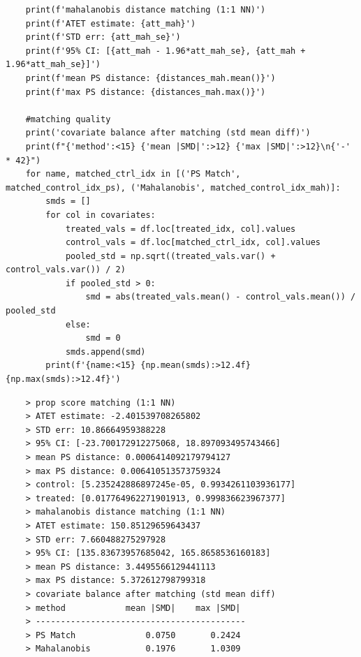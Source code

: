 \documentclass[10pt]{article}
\begin{document}
\begin{lstlisting}
    print(f'mahalanobis distance matching (1:1 NN)')
    print(f'ATET estimate: {att_mah}')
    print(f'STD err: {att_mah_se}')
    print(f'95% CI: [{att_mah - 1.96*att_mah_se}, {att_mah + 1.96*att_mah_se}]')
    print(f'mean PS distance: {distances_mah.mean()}')
    print(f'max PS distance: {distances_mah.max()}')

    #matching quality
    print('covariate balance after matching (std mean diff)')
    print(f"{'method':<15} {'mean |SMD|':>12} {'max |SMD|':>12}\n{'-' * 42}")
    for name, matched_ctrl_idx in [('PS Match', matched_control_idx_ps), ('Mahalanobis', matched_control_idx_mah)]:
        smds = []
        for col in covariates: 
            treated_vals = df.loc[treated_idx, col].values 
            control_vals = df.loc[matched_ctrl_idx, col].values 
            pooled_std = np.sqrt((treated_vals.var() + control_vals.var()) / 2)
            if pooled_std > 0: 
                smd = abs(treated_vals.mean() - control_vals.mean()) / pooled_std
            else: 
                smd = 0 
            smds.append(smd)
        print(f'{name:<15} {np.mean(smds):>12.4f} {np.max(smds):>12.4f}')
\end{lstlisting}
\begin{verbatim}
    > prop score matching (1:1 NN)
    > ATET estimate: -2.401539708265802
    > STD err: 10.86664959388228
    > 95% CI: [-23.700172912275068, 18.897093495743466]
    > mean PS distance: 0.0006414092179794127
    > max PS distance: 0.006410513573759324
    > control: [5.235242886897245e-05, 0.9934261103936177]
    > treated: [0.017764962271901913, 0.999836623967377]
    > mahalanobis distance matching (1:1 NN)
    > ATET estimate: 150.85129659643437
    > STD err: 7.660488275297928
    > 95% CI: [135.83673957685042, 165.8658536160183]
    > mean PS distance: 3.4495566129441113
    > max PS distance: 5.372612798799318
    > covariate balance after matching (std mean diff)
    > method            mean |SMD|    max |SMD|
    > ------------------------------------------
    > PS Match              0.0750       0.2424
    > Mahalanobis           0.1976       1.0309
\end{verbatim}
\end{document}

